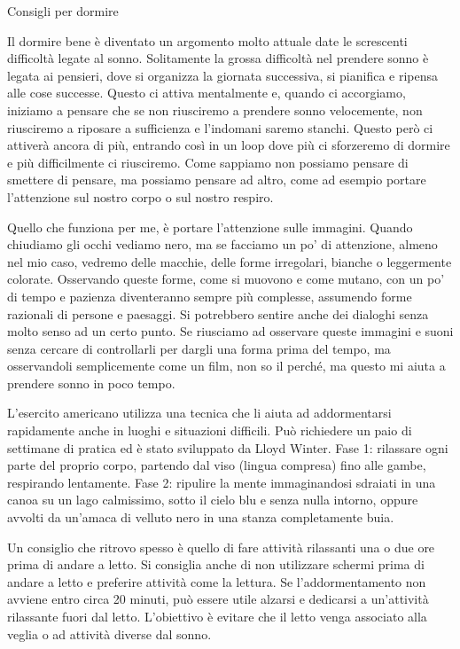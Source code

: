 \documentclass[12pt]{book} %
\begin{document}
\begin{mdframed}[linewidth=1pt]
Consigli per dormire

Il dormire bene è diventato un argomento molto attuale date le screscenti difficoltà legate al
sonno. Solitamente la grossa difficoltà nel prendere sonno è legata ai pensieri, dove si
organizza la giornata successiva, si pianifica e ripensa alle cose successe. Questo ci attiva mentalmente e,
quando ci accorgiamo, iniziamo a pensare che se non riusciremo a prendere sonno velocemente, non riusciremo a riposare
a sufficienza e l'indomani saremo stanchi. Questo però ci attiverà ancora di più, entrando così in
un loop dove più ci sforzeremo di dormire e più difficilmente ci riusciremo. Come sappiamo non possiamo pensare di smettere di
pensare, ma possiamo pensare ad altro, come ad esempio portare l'attenzione sul nostro corpo o sul
nostro respiro. 

Quello che funziona per me, è portare l'attenzione sulle immagini. Quando chiudiamo gli occhi vediamo nero, ma se
facciamo un po' di attenzione, almeno nel mio caso, vedremo delle macchie, delle forme irregolari, bianche o
leggermente colorate. Osservando queste forme, come si muovono e come mutano, con un po' di tempo
e pazienza diventeranno sempre più complesse, assumendo forme razionali di persone e paesaggi. Si potrebbero sentire anche
dei dialoghi senza molto senso ad un certo punto. Se riusciamo ad osservare queste immagini e suoni senza cercare di
controllarli per dargli una forma prima del tempo, ma osservandoli semplicemente come un film, non so il perché, ma
questo mi aiuta a prendere sonno in poco tempo.

L'esercito americano utilizza una tecnica che li aiuta ad
addormentarsi rapidamente anche in luoghi e situazioni difficili. Può richiedere un paio di settimane di pratica ed è stato
sviluppato da Lloyd Winter. Fase 1: rilassare ogni parte del proprio corpo, partendo
dal viso (lingua compresa) fino alle gambe, respirando lentamente. Fase 2: ripulire la mente immaginandosi sdraiati in
una canoa su un lago calmissimo, sotto il cielo blu e senza nulla intorno, oppure avvolti da un'amaca di velluto nero
in una stanza completamente buia.

Un consiglio che ritrovo spesso è quello di
fare attività rilassanti una o due ore prima di andare a letto. Si consiglia anche di non utilizzare schermi prima
di andare a letto e preferire attività come la lettura. Se l'addormentamento non avviene entro circa 20 minuti, può essere utile alzarsi e dedicarsi a un'attività rilassante fuori dal letto. L'obiettivo è evitare che il letto venga associato alla veglia o ad attività diverse dal sonno.


\end{mdframed}
\end{document}
